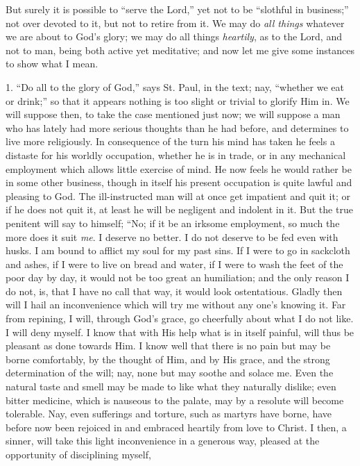 But surely it is possible to ``serve the Lord,'' yet not to
be ``slothful in business;'' not over devoted to it, but not
to retire from it. We may do \emph{all things} whatever we are about
to God's glory; we may do all things \emph{heartily}, as to the Lord,
and not to man, being both active yet meditative; and now let me give
some instances to show what I mean.

1. ``Do all to the glory of God,'' says St. Paul, in the
text; nay, ``whether we eat or drink;'' so that it appears
nothing is too slight or trivial to glorify Him in. We will suppose
then, to take the case mentioned just now; we will suppose a man who
has lately had more serious thoughts than he had before, and
determines to live more religiously. In consequence of the turn his
mind has taken he feels a distaste for his worldly occupation, whether
he is in trade, or in any mechanical employment which allows little
exercise of mind. He now feels he would rather be in some other
business, though in itself his present occupation is quite lawful and
pleasing to God. The ill-instructed man will at once get impatient and
quit it; or if he does not quit it, at least he will be negligent and
indolent in it. But the true penitent will say to himself; ``No;
if it be an irksome employment, so much the more does it suit \emph{me}.
I deserve no better. I do not deserve to be fed even with husks. I am
bound to afflict my soul for my past sins. If I were to go in
sackcloth and ashes, if I were to live on bread and water, if I were
to wash the feet of the poor day by day, it would not be too great an
humiliation; and the only reason I do not, is, that I have no call
that way, it would look ostentatious. Gladly then will I hail an
inconvenience which will try me without any one's knowing it. Far from
repining, I will, through God's grace, go cheerfully about what I do
not like. I will deny myself. I know that with His help what is in
itself painful, will thus be pleasant as done towards Him. I know well
that there is no pain but may be borne comfortably, by the thought of
Him, and by His grace, and the strong determination of the will; nay,
none but may soothe and solace me. Even the natural taste and smell
may be made to like what they naturally dislike; even bitter medicine,
which is nauseous to the palate, may by a resolute will become
tolerable. Nay, even sufferings and torture, such as martyrs have
borne, have before now been rejoiced in and embraced heartily from
love to Christ. I then, a sinner, will take this light inconvenience
in a generous way, pleased at the opportunity of disciplining myself,
